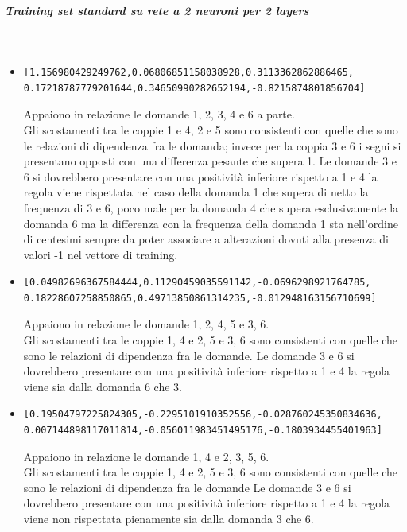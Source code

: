\documentclass[10pt,a4paper]{article}
\begin{document}
\subparagraph{Training set standard su rete a 2 neuroni per 2 layers}\mbox{}
\label{Training set standard su rete a 2 neuroni}
\\
\begin{itemize}
\item \begin{verbatim}[1.156980429249762,0.06806851158038928,0.3113362862886465,
0.17218787779201644,0.34650990282652194,-0.8215874801856704]\end{verbatim}
Appaiono in relazione le domande 1, 2, 3, 4  e 6 a parte.\\
Gli scostamenti tra le coppie  1 e 4, 2 e 5 sono consistenti con quelle che sono le relazioni di dipendenza fra le domanda; invece per la coppia 3 e 6 i segni si presentano opposti  con una differenza pesante che supera 1.
Le domande 3 e 6 si dovrebbero presentare con una positivit\`a inferiore rispetto a 1 e 4 la regola viene rispettata nel caso della domanda 1 che supera di netto la frequenza di 3 e 6, poco male per la domanda 4 che supera esclusivamente la domanda 6 ma la differenza con la frequenza della domanda 1 sta nell'ordine di centesimi sempre da poter associare a alterazioni dovuti alla presenza di valori -1 nel vettore di training.

\item \begin{verbatim}[0.04982696367584444,0.11290459035591142,-0.0696298921764785, 
0.18228607258850865,0.49713850861314235,-0.012948163156710699]\end{verbatim}
Appaiono in relazione le domande 1, 2, 4, 5 e 3, 6.\\
Gli scostamenti tra le coppie 1, 4 e 2, 5  e 3, 6 sono consistenti con quelle che sono le relazioni di dipendenza fra le domande.
Le domande 3 e 6 si dovrebbero presentare con una positivit\`a inferiore rispetto a 1 e 4 la regola viene sia dalla domanda 6 che 3.

\item \begin{verbatim}[0.19504797225824305,-0.2295101910352556,-0.028760245350834636,
0.007144898117011814,-0.056011983451495176,-0.1803934455401963]\end{verbatim}
Appaiono in relazione le domande 1, 4 e 2, 3, 5, 6.\\
Gli scostamenti tra le coppie 1, 4 e 2, 5 e 3, 6 sono consistenti con quelle che sono le relazioni di dipendenza fra le domande
Le domande 3 e 6 si dovrebbero presentare con una positivit\`a inferiore rispetto a 1 e 4 la regola viene non rispettata pienamente sia dalla domanda 3 che 6.


\end{itemize}
\end{document}
